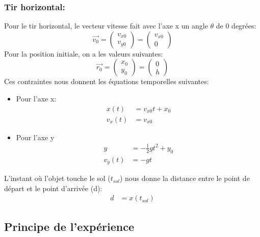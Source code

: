 \documentclass[12pt,a4paper]{article}
\begin{document}
    \subsubsection{Tir horizontal:}
    Pour le tir horizontal, le vecteur vitesse fait avec l'axe x un angle $\theta$ de 0 degrées:
    \begin{equation*}
        \vec{v_0}=
        \begin{pmatrix}
            v_{x0} \\
            v_{y0}
        \end{pmatrix}
        =
        \begin{pmatrix}
            v_{x0} \\
            0
        \end{pmatrix}
    \end{equation*}
    Pour la position initiale, on a les valeurs suivantes:
    \begin{equation*}
        \vec{r_0}=
        \begin{pmatrix}
            x_0 \\
            y_0
        \end{pmatrix}
        =
        \begin{pmatrix}
            0 \\
            h
        \end{pmatrix}
    \end{equation*}
    Ces contraintes nous donnent les équations temporelles suivantes:
    \begin{itemize}
        \item Pour l'axe x:
        \begin{align*}
            x(t)&=v_{x0}t+x_0 \\
            v_x(t)&=v_{x0}
        \end{align*}
        \item Pour l'axe y
        \begin{align*}
            y&=-\frac{1}{2}gt^2+y_0 \\
            v_y(t)&=-gt
        \end{align*}
    \end{itemize}
    L'instant où l'objet touche le sol ($t_{sol}$) nous donne la distance entre le point de départ et le point d'arrivée (d):
    \begin{align*}
        d&=x(t_{sol})
    \end{align*}
    \subsection{Principe de l'expérience}
\end{document}
